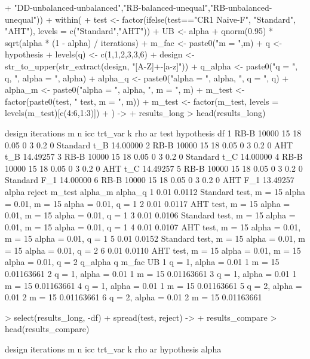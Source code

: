 \documentclass[12pt]{article}
\begin{document}
\begin{Schunk}
\begin{Sinput}
+                        "DD-unbalanced-unbalanced","RB-balanced-unequal","RB-unbalanced-unequal")) %>%
+   within({
+     test <- factor(ifelse(test=="CR1 Naive-F", "Standard", "AHT"), levels = c("Standard","AHT"))
+     UB <- alpha + qnorm(0.95) * sqrt(alpha * (1 - alpha) / iterations)
+     m_fac <- paste0("m = ",m)
+     q <- hypothesis
+     levels(q) <- c(1,1,2,3,3,6)
+     design <- str_to_upper(str_extract(design, "[A-Z]+-[a-z]"))
+     q_alpha <- paste0("q = ", q, ", alpha = ", alpha)
+     alpha_q <- paste0("alpha = ", alpha, ", q = ", q)
+     alpha_m <- paste0("alpha = ", alpha, ", m = ", m)
+     m_test <- factor(paste0(test, " test, m = ", m))
+     m_test <- factor(m_test, levels = levels(m_test)[c(4:6,1:3)])
+   }) ->
+   results_long
> head(results_long)
\end{Sinput}
\begin{Soutput}
  design iterations  m  n  icc trt_var k rho ar     test hypothesis       df
1   RB-B      10000 15 18 0.05       0 3 0.2  0 Standard        t_B 14.00000
2   RB-B      10000 15 18 0.05       0 3 0.2  0      AHT        t_B 14.49257
3   RB-B      10000 15 18 0.05       0 3 0.2  0 Standard        t_C 14.00000
4   RB-B      10000 15 18 0.05       0 3 0.2  0      AHT        t_C 14.49257
5   RB-B      10000 15 18 0.05       0 3 0.2  0 Standard        F_1 14.00000
6   RB-B      10000 15 18 0.05       0 3 0.2  0      AHT        F_1 13.49257
  alpha reject                m_test              alpha_m             alpha_q
1  0.01 0.0112 Standard test, m = 15 alpha = 0.01, m = 15 alpha = 0.01, q = 1
2  0.01 0.0117      AHT test, m = 15 alpha = 0.01, m = 15 alpha = 0.01, q = 1
3  0.01 0.0106 Standard test, m = 15 alpha = 0.01, m = 15 alpha = 0.01, q = 1
4  0.01 0.0107      AHT test, m = 15 alpha = 0.01, m = 15 alpha = 0.01, q = 1
5  0.01 0.0152 Standard test, m = 15 alpha = 0.01, m = 15 alpha = 0.01, q = 2
6  0.01 0.0110      AHT test, m = 15 alpha = 0.01, m = 15 alpha = 0.01, q = 2
              q_alpha q  m_fac         UB
1 q = 1, alpha = 0.01 1 m = 15 0.01163661
2 q = 1, alpha = 0.01 1 m = 15 0.01163661
3 q = 1, alpha = 0.01 1 m = 15 0.01163661
4 q = 1, alpha = 0.01 1 m = 15 0.01163661
5 q = 2, alpha = 0.01 2 m = 15 0.01163661
6 q = 2, alpha = 0.01 2 m = 15 0.01163661
\end{Soutput}
\begin{Sinput}
> select(results_long, -df) %>%
+   spread(test, reject) ->
+   results_compare
> head(results_compare)
\end{Sinput}
\begin{Soutput}
  design iterations  m  n  icc trt_var k rho ar hypothesis alpha

\end{Soutput}
\end{Schunk}
\end{document}

